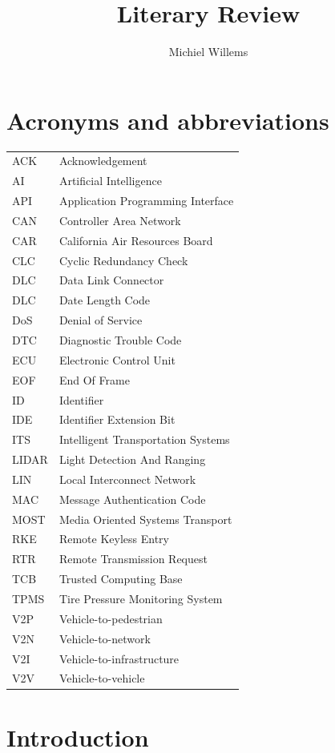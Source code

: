 \documentclass[11pt]{article}
\title{Literary Review}
\author{Michiel Willems}
\begin{document}
	


\section{Acronyms and abbreviations}
\begin{tabular}{ l l }
	ACK & Acknowledgement \\
	AI & Artificial Intelligence \\
	API & Application Programming Interface \\
	CAN & Controller Area Network \\
	CAR & California Air Resources Board \\
	CLC & Cyclic Redundancy Check \\
	DLC & Data Link Connector \\
	DLC & Date Length Code \\
	DoS & Denial of Service \\
	DTC & Diagnostic Trouble Code \\
	ECU & Electronic Control Unit \\
	EOF & End Of Frame \\
	ID & Identifier \\
	IDE & Identifier Extension Bit \\
	ITS & Intelligent Transportation Systems \\
	LIDAR & Light Detection And Ranging \\
	LIN & Local Interconnect Network \\
	MAC & Message Authentication Code \\
	MOST & Media Oriented Systems Transport \\
	RKE & Remote Keyless Entry \\
	RTR & Remote Transmission Request \\
	TCB & Trusted Computing Base \\
	TPMS & Tire Pressure Monitoring System \\
	V2P & Vehicle-to-pedestrian \\
	V2N & Vehicle-to-network \\
	V2I & Vehicle-to-infrastructure  \\
	V2V & Vehicle-to-vehicle \\
\end{tabular}

\newpage
\tableofcontents

\section{Introduction}
\label{sec:introduction}
\end{document}
